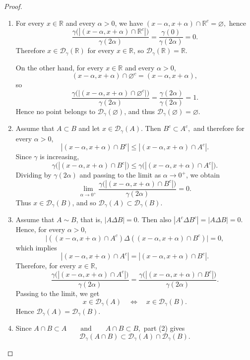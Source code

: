 \documentclass{amsart}
\theoremstyle{plain}
\numberwithin{equation}{section}
\begin{document}
\begin{proof}
\begin{enumerate}
\item
For every $x\in\mathbb{R}$ and every $\alpha>0$, we have $ (x-\alpha,x+\alpha)\cap \mathbb{R}^c=\varnothing, $
hence $$ \frac{\gamma\bigl(|(x-\alpha,x+\alpha)\cap \mathbb{R}^c|\bigr)}{\gamma(2\alpha)} = \frac{\gamma(0)}{\gamma(2\alpha)} =0.$$
Therefore $x\in \mathcal{D}_\gamma(\mathbb{R})$ for every $x\in\mathbb{R}$, so
$ \mathcal{D}_\gamma(\mathbb{R})=\mathbb{R}. $

On the other hand, for every $x\in\mathbb{R}$ and every $\alpha>0$,
$$(x-\alpha,x+\alpha)\cap \varnothing^c=(x-\alpha,x+\alpha), $$
so
$$ \frac{\gamma\bigl(|(x-\alpha,x+\alpha)\cap \varnothing^c|\bigr)}{\gamma(2\alpha)} = \frac{\gamma(2\alpha)}{\gamma(2\alpha)} =1. $$
Hence no point belongs to $\mathcal{D}_\gamma(\varnothing)$, and thus $ \mathcal{D}_\gamma(\varnothing)=\varnothing. $

\item Assume that $A\subset B$ and let $x\in \mathcal{D}_\gamma(A)$. Then $ B^c\subset A^c, $ and therefore for every $\alpha>0$, $$ |(x-\alpha,x+\alpha)\cap B^c| \le |(x-\alpha,x+\alpha)\cap A^c|.$$
Since $\gamma$ is increasing, $$ \gamma\bigl(|(x-\alpha,x+\alpha)\cap B^c|\bigr) \le \gamma\bigl(|(x-\alpha,x+\alpha)\cap A^c|\bigr).$$
Dividing by $\gamma(2\alpha)$ and passing to the limit as $\alpha\to0^+$, we obtain
$$ \lim_{\alpha\to0^+} \frac{\gamma\bigl(|(x-\alpha,x+\alpha)\cap B^c|\bigr)}{\gamma(2\alpha)} =0. $$
Thus $x\in \mathcal{D}_\gamma(B)$, and so $ \mathcal{D}_\gamma(A)\subset \mathcal{D}_\gamma(B). $

\item
Assume that $A\sim B$, that is, $ |A\Delta B|=0. $
Then also $|A^c\Delta B^c|=|A\Delta B|=0.$
Hence, for every $\alpha>0$,
$$ \bigl|((x-\alpha,x+\alpha)\cap A^c)\Delta((x-\alpha,x+\alpha)\cap B^c)\bigr|=0, $$
which implies $$ |(x-\alpha,x+\alpha)\cap A^c| = |(x-\alpha,x+\alpha)\cap B^c|. $$
Therefore, for every $x\in\mathbb{R}$, $$ \frac{\gamma\bigl(|(x-\alpha,x+\alpha)\cap A^c|\bigr)}{\gamma(2\alpha)} = \frac{\gamma\bigl(|(x-\alpha,x+\alpha)\cap B^c|\bigr)}{\gamma(2\alpha)}. $$
Passing to the limit, we get
$$ x\in \mathcal{D}_\gamma(A) \quad\Longleftrightarrow\quad x\in \mathcal{D}_\gamma(B).$$
Hence $ \mathcal{D}_\gamma(A)=\mathcal{D}_\gamma(B). $

\item
Since $ A\cap B\subset A \qquad\text{and}\qquad A\cap B\subset B,$
part (2) gives
$$
\mathcal{D}_\gamma(A\cap B)\subset \mathcal{D}_\gamma(A)\cap \mathcal{D}_\gamma(B).
$$


\end{enumerate}
\end{proof}
\end{document}

